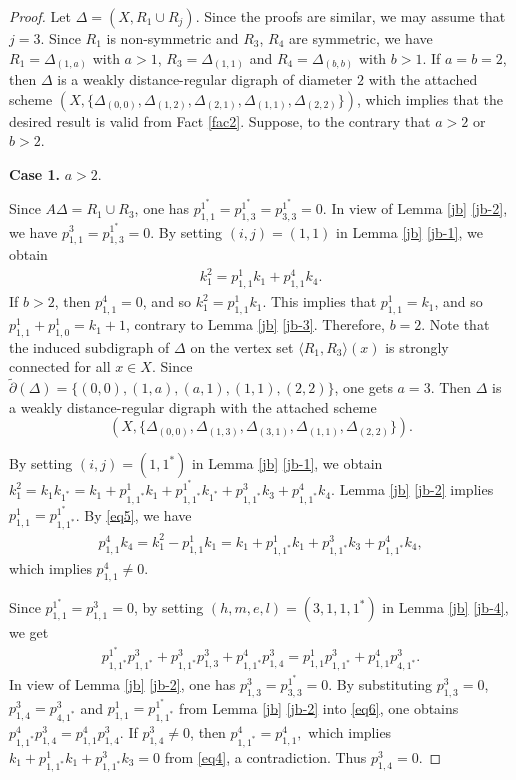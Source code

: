 \documentclass[12pt,a4paper]{amsart}
\theoremstyle{definition}
\begin{document}
\begin{proof}
Let $\Delta=(X,R_1\cup R_j)$. Since the proofs are similar, we may assume that $j=3$. Since $R_1$ is non-symmetric and $R_3$, $R_4$ are symmetric, we have $R_1=\Delta_{(1,a)}$  with $a>1$, $R_3=\Delta_{(1,1)}$ and $R_4=\Delta_{(b,b)}$  with $b>1$. If $a=b=2$, then $\Delta$ is a weakly distance-regular digraph of diameter $2$ with the attached scheme $(X,\{\Delta_{(0,0)},\Delta_{(1,2)},\Delta_{(2,1)},\Delta_{(1,1)},\Delta_{(2,2)}\})$, which implies that the desired result is valid from Fact \ref{fac2}. Suppose, to the contrary that $a>2$ or $b>2$.

\textbf{Case 1.} $a>2$.

Since $A\Delta=R_1\cup R_3$, one has $p_{1,1}^{1^{*}}=p_{1,3}^{1^{*}}=p_{3,3}^{1^{*}}=0$. In view of Lemma \ref{jb} \ref{jb-2}, we have $p_{1,1}^{3}=p_{1,3}^{1^{*}}=0$. By setting $(i,j)=(1,1)$ in Lemma \ref{jb} \ref{jb-1}, we obtain
\begin{align}
k_1^2=p_{1,1}^1k_1+p_{1,1}^4k_4.\label{eq5}
\end{align}
If $b>2$, then $p_{1,1}^{4}=0$, and so $k_1^2=p_{1,1}^1k_1$. This implies that $p_{1,1}^1=k_1$, and so $p_{1,1}^1+p_{1,0}^1=k_{1}+1$, contrary to Lemma \ref{jb} \ref{jb-3}. Therefore, $b=2$. Note that the induced subdigraph of $\Delta$ on the vertex set $\langle R_1,R_3 \rangle(x)$ is strongly connected for all $x\in X$. Since $\tilde{\partial}(\Delta)=\{(0,0),(1,a),(a,1),(1,1),(2,2)\}$, one gets $a=3$. Then $\Delta$ is a weakly distance-regular digraph with the attached scheme $$(X,\{\Delta_{(0,0)},\Delta_{(1,3)},\Delta_{(3,1)},\Delta_{(1,1)},\Delta_{(2,2)}\}).$$

By setting $(i,j)=(1,1^*)$ in Lemma \ref{jb} \ref{jb-1}, we obtain $k_1^2=k_{1}k_{1^{*}}=k_1+p_{1,1^{*}}^{1}k_1+p_{1,1^{*}}^{1^*}k_{1^*}+p_{1,1^{*}}^{3}k_3+p_{1,1^{*}}^{4}k_4$. Lemma \ref{jb} \ref{jb-2} implies $p^{1}_{1,1}=p^{1^{*}}_{1,1^{*}}$. By \eqref{eq5}, we have
\begin{align}
	p_{1,1}^{4}k_4=k_1^2-p_{1,1}^1k_1=k_1+p_{1,1^{*}}^{1}k_1+p_{1,1^{*}}^{3}k_3+p_{1,1^{*}}^{4}k_4,\label{eq4}
\end{align}
which implies $p_{1,1}^{4}\neq0.$

Since $p_{1,1}^{1^*}=p_{1,1}^3=0$, by setting $(h,m,e,l)=(3,1,1,1^{*})$ in Lemma \ref{jb} \ref{jb-4}, we get
\begin{align}
p_{1,1^{*}}^{1^{*}}p_{1,1^{*}}^{3}+p_{1,1^{*}}^{3}p_{1,3}^{3}+p_{1,1^{*}}^{4}p_{1,4}^{3}=p_{1,1}^{1}p_{1,1^{*}}^{3}+p_{1,1}^{4}p_{4,1^{*}}^{3}.\label{eq6}
\end{align}
In view of Lemma \ref{jb} \ref{jb-2}, one has $ p_{1,3}^{3}=p_{3,3}^{1^{*}}=0$. By substituting $ p_{1,3}^{3}=0$, $p_{1,4}^{3}=p_{4,1^{*}}^{3}$ and $p_{1,1}^{1}=p_{1,1^{*}}^{1^{*}}$ from Lemma \ref{jb} \ref{jb-2} into \eqref{eq6}, one obtains $p_{1,1^{*}}^{4}p_{1,4}^{3}=p_{1,1}^{4}p_{1,4}^{3}.$
If $p_{1,4}^{3}\neq0$, then $p_{1,1^{*}}^{4}=p_{1,1}^{4},$ which implies $k_1+p_{1,1^{*}}^{1}k_1+p_{1,1^{*}}^{3}k_3=0$ from \eqref{eq4}, a contradiction. Thus $p_{1,4}^{3}=0.$


\end{proof}
\end{document}
